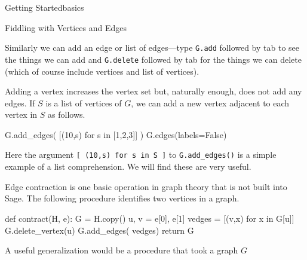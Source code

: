 \begin{chap}{Getting Started}{basics}
\begin{sect}{Fiddling with Vertices and Edges}
\begin{sagecode}
\begin{sageoutput}
[(0, 2), (0, 8), (1, 2), (1, 3), 
(1, 8), (2, 3), (3, 4), (3, 5), 
(4, 5), (4, 6), (5, 6), (5, 7), 
(6, 7), (6, 8), (7, 8)]
\end{sageoutput}
\end{sagecode}
%
\begin{para}
Similarly we can add an edge or list of edges---type \verb|G.add|
followed by tab to see the things we can add and \verb|G.delete|
followed by tab for the things we can delete (which of course include
vertices and list of vertices).
\end{para}
%
\begin{para}
Adding a vertex increases the vertex set but, naturally enough, does
not add any edges.
If $S$ is a list of vertices of $G$, we can add a new vertex adjacent to 
each vertex in $S$ as follows.
\end{para}
%
\begin{sagecode}
\begin{sageinput}
G.add_edges( [(10,s) for s in [1,2,3]] )
G.edges(labels=False)
\end{sageinput}
\begin{sageoutput}
[(0, 2), (0, 8), (1, 2), (1, 3), 
(1, 8), (1, 10), (2, 3), (2, 10), 
(3, 4), (3, 5), (3, 10), (4, 5), 
(4, 6), (5, 6), (5, 7), (6, 7), 
(6, 8), (7, 8)]
\end{sageoutput}
\end{sagecode}
%
\begin{para}
Here the argument \verb|[ (10,s) for s in S ]| to \verb|G.add_edges()| 
is a simple example of a list comprehension.  
We will find these are very useful.
\end{para}
%
\begin{para}
Edge contraction is one basic operation in graph theory that is not built 
into Sage.  The following procedure identifies two vertices in a graph.
\end{para}
%
\begin{sagecode}
\begin{sageinput}
def contract(H, e):
    G = H.copy() 
    u, v = e[0], e[1]
    vedges = [(v,x) for x in G[u]]  
    G.delete_vertex(u)
    G.add_edges( vedges)
    return G
\end{sageinput}
\begin{sageoutput}
\end{sageoutput}
\end{sagecode}
%
\begin{para}
A useful generalization would be a procedure that took a graph $G$

\end{para}
\end{sect}
\end{chap}
